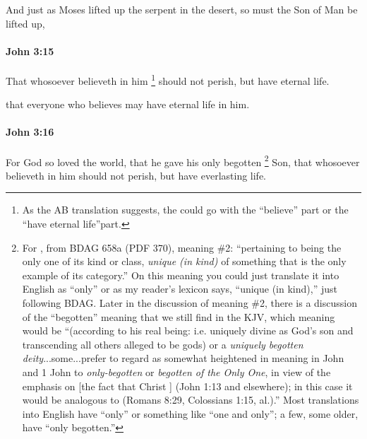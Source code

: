 			\begin{framed}
			\scriptsize
				\begin{compactdesc}
					\item[SBLG] 
					\item[AB 129] And just as Moses lifted up the serpent in the desert,
									so must the Son of Man be lifted up,
				\end{compactdesc}
			\end{framed}

		\paragraph{John 3:15} %
			\label{JOHN-3-15}

			That whosoever believeth in him%
				\footnote{%
					As the AB translation suggests, the  could go with the ``believe'' part or the ``have eternal life''part.
					}
			should not perish, but have eternal life.
			
			\begin{framed}
			\scriptsize
				\begin{compactdesc}
					\item[SBLG] \gr{ἵνα πᾶς ὁ πιστεύων ἐν αὐτῷ ἔχῃ ζωὴν αἰώνιον.}
					\item[AB 129] that everyone who believes
									may have eternal life in him.
				\end{compactdesc}
			\end{framed}

		\paragraph{John 3:16} %
			\label{JOHN-3-16}

			For God so loved the world, that he gave his only begotten%
				\footnote{%
					For , from BDAG 658a (PDF 370), meaning \#2: ``pertaining to being the only one of its kind or class, \textit{unique (in kind)} of something that is the only example of its category.'' On this meaning you could just translate it into English as ``only'' or as my reader's lexicon says, ``unique (in kind),'' just following BDAG. Later in the discussion of meaning \#2, there is a discussion of the ``begotten'' meaning that we still find in the KJV, which meaning would be ``(according to his real being: i.e. uniquely divine as God's son and transcending all others alleged to be gods) or a \textit{uniquely begotten deity}...some...prefer to regard  as somewhat heightened in meaning in John and 1 John to \textit{only-begotten} or \textit{begotten of the Only One}, in view of the emphasis on [the fact that Christ ] (John 1:13 and elsewhere); in this case it would be analogous to  (Romans 8:29, Colossians 1:15, al.).'' Most translations into English have ``only'' or something like ``one and only''; a few, some older, have ``only begotten.''
					}
			Son, that whosoever believeth in him should not perish, but have everlasting life.

